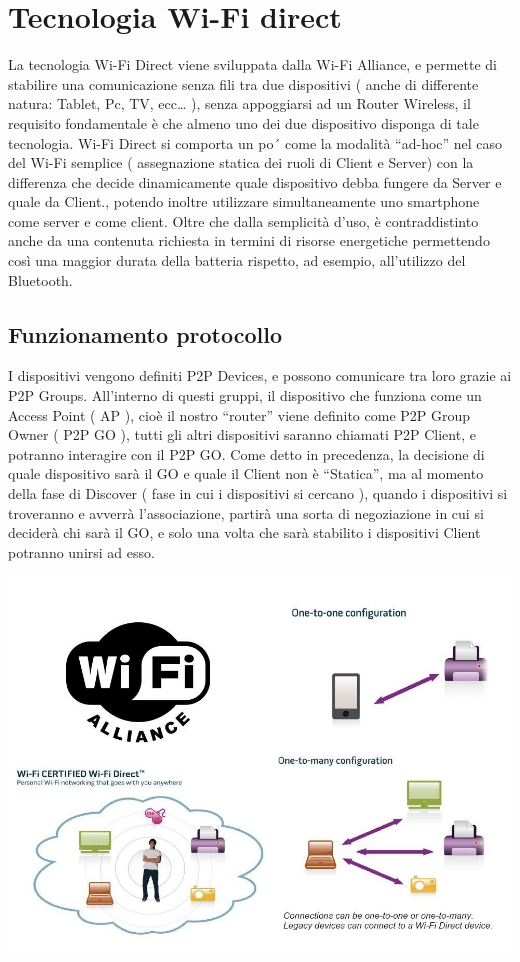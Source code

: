\chapter{Tecnologia Wi-Fi direct}
La tecnologia Wi-Fi Direct viene sviluppata dalla Wi-Fi Alliance, e permette di stabilire una comunicazione senza fili tra due dispositivi ( anche di differente natura: Tablet, Pc, TV, ecc… ), senza appoggiarsi ad un Router Wireless, il requisito fondamentale è che almeno uno dei due dispositivo disponga di tale tecnologia.
Wi-Fi Direct si comporta un po´ come la modalità “ad-hoc” nel caso del Wi-Fi semplice ( assegnazione statica dei ruoli di Client e Server) con la differenza che decide dinamicamente quale dispositivo debba fungere da Server e quale da Client., potendo inoltre utilizzare simultaneamente uno smartphone come server e come client.
Oltre che dalla semplicità d'uso, è contraddistinto anche da una contenuta richiesta in termini di risorse energetiche permettendo così una maggior durata della batteria rispetto, ad esempio, all'utilizzo del Bluetooth.


\section{Funzionamento protocollo}
I dispositivi vengono definiti P2P Devices, e possono comunicare tra loro grazie ai P2P Groups.
All’interno di questi gruppi, il dispositivo che funziona come un Access Point ( AP ), cioè il nostro “router” viene definito come P2P Group Owner ( P2P GO ), tutti gli altri dispositivi saranno chiamati P2P Client, e potranno interagire con il P2P GO.
Come detto in precedenza, la decisione di quale dispositivo sarà il GO e quale il Client non è “Statica”, ma al momento della fase di Discover ( fase in cui i dispositivi si cercano ), quando i dispositivi si troveranno e avverrà l’associazione, partirà una sorta di negoziazione in cui si deciderà chi sarà il GO, e solo una volta che sarà stabilito i dispositivi Client potranno unirsi ad esso.

\begin{center}
\includegraphics[width=1\textwidth]{imgs/wifi_alliance.jpg}
\label{wifi_alliance_img}%
\end{center}

